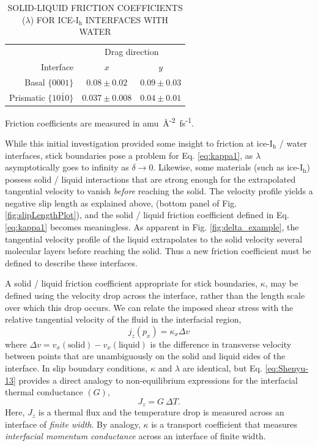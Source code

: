 \begin{table}[h]
\centering
\caption{SOLID-LIQUID FRICTION COEFFICIENTS ($\lambda$) FOR
  ICE-I$_\mathrm{h}$ INTERFACES WITH WATER }
\label{tab:lambda}
\begin{tabular}{r|cc}  
\hline
\hline
           & \multicolumn{2}{c}{Drag direction} \\ 
 Interface & $x$               & $y$  \\ \hline
     Basal  $\{0001\}$ &  $0.08 \pm 0.02$  & $0.09 \pm 0.03$ \\
 Prismatic  $\{10\bar{1}0\}$ & $0.037 \pm 0.008$ & $0.04 \pm 0.01$ \\ 
\hline
\hline
\end{tabular}
\begin{flushleft}
  Friction coefficients are measured in
  amu~\AA\textsuperscript{-2}~fs\textsuperscript{-1}.
\end{flushleft}
\end{table}



While this initial investigation provided some insight to friction at
ice-I$_\mathrm{h}$ / water interfaces, stick boundaries pose a problem
for Eq.  \eqref{eq:kappa1}, as $\lambda$ asymptotically goes to
infinity as $\delta \rightarrow 0$.  Likewise, some materials (such as
ice-I$_\mathrm{h}$) possess solid / liquid interactions that are
strong enough for the extrapolated tangential velocity to vanish
\textit{before} reaching the solid. The velocity profile yields a
negative slip length as explained above, (bottom panel of Fig.
\ref{fig:slipLengthPlot}), and the solid / liquid friction coefficient
defined in Eq. \eqref{eq:kappa1} becomes meaningless.  As apparent in
Fig. \ref{fig:delta_example}, the tangential velocity profile of the
liquid extrapolates to the solid velocity several molecular layers
before reaching the solid. Thus a new friction coefficient must be
defined to describe these interfaces.

A solid / liquid friction coefficient appropriate for stick
boundaries, $\kappa$, may be defined using the velocity drop
across the interface, rather than the length scale over which this
drop occurs. We can relate the imposed shear stress with the relative
tangential velocity of the fluid in the interfacial
region,\cite{Kuang2012}
\begin{equation}\label{eq:Shenyu-13}
j_{z}(p_{x}) = \kappa_{x} \Delta v
\end{equation}
where $\Delta v = v_{x}(\mathrm{solid}) - v_{x}(\mathrm{liquid})$ is
the difference in transverse velocity between points that are
unambiguously on the solid and liquid sides of the interface.  In slip
boundary conditions, $\kappa$ and $\lambda$ are identical, but
Eq. \eqref{eq:Shenyu-13} provides a direct analogy to non-equilibrium
expressions for the interfacial thermal conductance $(G)$,
\begin{equation}
J_z = G~ \Delta T.
\end{equation}
Here, $J_z$ is a thermal flux and the temperature drop is measured
across an interface of \textit{finite width}. By analogy, $\kappa$ is
a transport coefficient that measures \textit{interfacial momentum
  conductance} across an interface of finite width.

